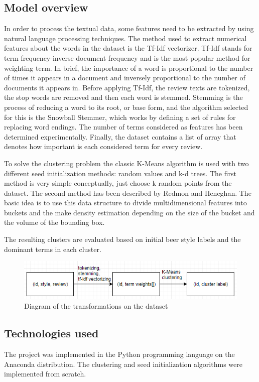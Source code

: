 \documentclass[12pt]{article}
\begin{document}
	\subsection{Model overview}
	In order to process the textual data, some features need to be extracted by using natural language processing techniques. The method used to extract numerical features about the words in the dataset is the Tf-Idf vectorizer. Tf-Idf\cite{TfIdfBook} stands for term frequency-inverse document frequency and is the most popular method for weighting term. In brief, the importance of a word is proportional to the number of times it appears in a document and inversely proportional to the number of documents it appears in. Before applying Tf-Idf, the review texts are tokenized, the stop words are removed and then each word is stemmed. Stemming is the process of reducing a word to its root, or base form, and the algorithm selected for this is the Snowball Stemmer\cite{SnowballStemmer}, which works by defining a set of rules for replacing word endings. The number of terms considered as features has been determined experimentally. Finally, the dataset contains a list of array that denotes how important is each considered term for every review.
	
	To solve the clustering problem the classic K-Means algorithm is used with two different seed initialization methods: random values and k-d trees. The first method is very simple conceptually, just choose k random points from the dataset. The second method has been described by Redmon and Heneghan\cite{KdTreeKmeans}. The basic idea is to use this data structure to divide multidimensional features into buckets and the make density estimation depending on the size of the bucket and the volume of the bounding box.
	
	The resulting clusters are evaluated based on initial beer style labels and the dominant terms in each cluster.
	
	\begin{figure}[H]
		\includegraphics[width=\linewidth]{resources/model.png}
		\caption{Diagram of the transformations on the dataset}
		\label{fig:modelOverview}
	\end{figure}

	\subsection{Technologies used}
	The project was implemented in the Python programming language on the Anaconda distribution. The clustering and seed initialization algorithms were implemented from scratch.
	
\end{document}
